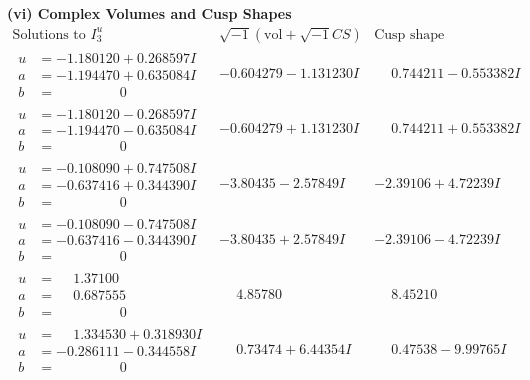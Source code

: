 \documentclass[1p]{elsarticle_modified}
\theoremstyle{definition}
\newcommand{\I}{\sqrt{-1}}
\begin{document}
\newpage\flushleft \textbf{(vi) Complex Volumes and Cusp Shapes}
$$\begin{array}{c|c|c}  
\text{Solutions to }I^u_{3}& \I (\text{vol} + \sqrt{-1}CS) & \text{Cusp shape}\\
 \hline 
\begin{aligned}
u &= -1.180120 + 0.268597 I \\
a &= -1.194470 + 0.635084 I \\
b &= \phantom{-0.000000 } 0\end{aligned}
 & -0.604279 - 1.131230 I & \phantom{-}0.744211 - 0.553382 I \\ \hline\begin{aligned}
u &= -1.180120 - 0.268597 I \\
a &= -1.194470 - 0.635084 I \\
b &= \phantom{-0.000000 } 0\end{aligned}
 & -0.604279 + 1.131230 I & \phantom{-}0.744211 + 0.553382 I \\ \hline\begin{aligned}
u &= -0.108090 + 0.747508 I \\
a &= -0.637416 + 0.344390 I \\
b &= \phantom{-0.000000 } 0\end{aligned}
 & -3.80435 - 2.57849 I & -2.39106 + 4.72239 I \\ \hline\begin{aligned}
u &= -0.108090 - 0.747508 I \\
a &= -0.637416 - 0.344390 I \\
b &= \phantom{-0.000000 } 0\end{aligned}
 & -3.80435 + 2.57849 I & -2.39106 - 4.72239 I \\ \hline\begin{aligned}
u &= \phantom{-}1.37100\phantom{ +0.000000I} \\
a &= \phantom{-}0.687555\phantom{ +0.000000I} \\
b &= \phantom{-0.000000 } 0\end{aligned}
 & \phantom{-}4.85780\phantom{ +0.000000I} & \phantom{-}8.45210\phantom{ +0.000000I} \\ \hline\begin{aligned}
u &= \phantom{-}1.334530 + 0.318930 I \\
a &= -0.286111 - 0.344558 I \\
b &= \phantom{-0.000000 } 0\end{aligned}
 & \phantom{-}0.73474 + 6.44354 I & \phantom{-}0.47538 - 9.99765 I \\ \hline\begin{aligned}

\end{aligned}
\end{array}$$
\end{document}

